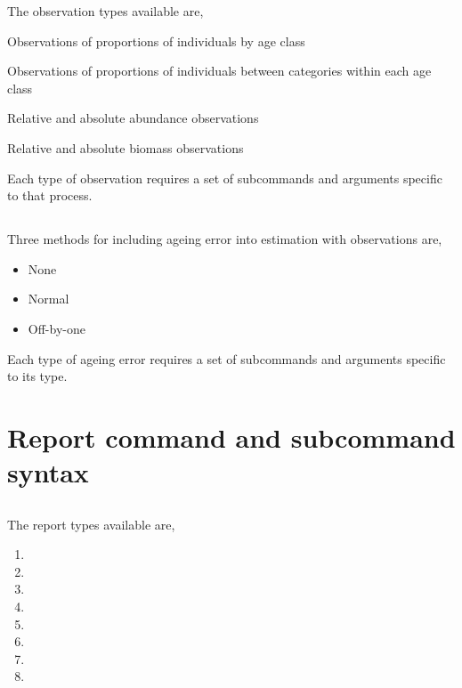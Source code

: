 The observation types available are,

\begin{description}
  \item Observations of proportions of individuals by age class
  \item Observations of proportions of individuals between categories within each age class
  \item Relative and absolute abundance observations
  \item Relative and absolute biomass observations
\end{description}

Each type of observation requires a set of subcommands and arguments specific to that process.



\subsection{}


\subsection{}

Three methods for including ageing error into estimation with observations are,

\begin{itemize}
	\item None
	\item Normal
	\item Off-by-one
\end{itemize}

Each type of ageing error requires a set of subcommands and arguments specific to its type.



\section{Report command and subcommand syntax\label{sec:report-syntax}}

\subsection{}

The report types available are,

\begin{enumerate}
  \item 
  \item
  \item
  \item
  \item
  \item
  \item
  \item
\end{enumerate}

